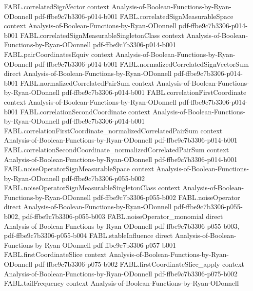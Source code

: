\begin{theorem}
\proofstep
  {FABL.correlatedSignVector}
  {context}
  {Analysis-of-Boolean-Functions-by-Ryan-ODonnell}
  {pdf-ffbe9c7b3306-p014-b001}
\proofstep
  {FABL.correlatedSignMeasurableSpace}
  {context}
  {Analysis-of-Boolean-Functions-by-Ryan-ODonnell}
  {pdf-ffbe9c7b3306-p014-b001}
\proofstep
  {FABL.correlatedSignMeasurableSingletonClass}
  {context}
  {Analysis-of-Boolean-Functions-by-Ryan-ODonnell}
  {pdf-ffbe9c7b3306-p014-b001}
\proofstep
  {FABL.pairCoordinatesEquiv}
  {context}
  {Analysis-of-Boolean-Functions-by-Ryan-ODonnell}
  {pdf-ffbe9c7b3306-p014-b001}
\proofstep
  {FABL.normalizedCorrelatedSignVectorSum}
  {direct}
  {Analysis-of-Boolean-Functions-by-Ryan-ODonnell}
  {pdf-ffbe9c7b3306-p014-b001}
\proofstep
  {FABL.normalizedCorrelatedPairSum}
  {context}
  {Analysis-of-Boolean-Functions-by-Ryan-ODonnell}
  {pdf-ffbe9c7b3306-p014-b001}
\proofstep
  {FABL.correlationFirstCoordinate}
  {context}
  {Analysis-of-Boolean-Functions-by-Ryan-ODonnell}
  {pdf-ffbe9c7b3306-p014-b001}
\proofstep
  {FABL.correlationSecondCoordinate}
  {context}
  {Analysis-of-Boolean-Functions-by-Ryan-ODonnell}
  {pdf-ffbe9c7b3306-p014-b001}
\proofstep
  {FABL.correlationFirstCoordinate_normalizedCorrelatedPairSum}
  {context}
  {Analysis-of-Boolean-Functions-by-Ryan-ODonnell}
  {pdf-ffbe9c7b3306-p014-b001}
\proofstep
  {FABL.correlationSecondCoordinate_normalizedCorrelatedPairSum}
  {context}
  {Analysis-of-Boolean-Functions-by-Ryan-ODonnell}
  {pdf-ffbe9c7b3306-p014-b001}
\proofstep
  {FABL.noiseOperatorSignMeasurableSpace}
  {context}
  {Analysis-of-Boolean-Functions-by-Ryan-ODonnell}
  {pdf-ffbe9c7b3306-p055-b002}
\proofstep
  {FABL.noiseOperatorSignMeasurableSingletonClass}
  {context}
  {Analysis-of-Boolean-Functions-by-Ryan-ODonnell}
  {pdf-ffbe9c7b3306-p055-b002}
\proofstep
  {FABL.noiseOperator}
  {direct}
  {Analysis-of-Boolean-Functions-by-Ryan-ODonnell}
  {pdf-ffbe9c7b3306-p055-b002,
    pdf-ffbe9c7b3306-p055-b003}
\proofstep
  {FABL.noiseOperator_monomial}
  {direct}
  {Analysis-of-Boolean-Functions-by-Ryan-ODonnell}
  {pdf-ffbe9c7b3306-p055-b003,
    pdf-ffbe9c7b3306-p055-b004}
\proofstep
  {FABL.stableInfluence}
  {direct}
  {Analysis-of-Boolean-Functions-by-Ryan-ODonnell}
  {pdf-ffbe9c7b3306-p057-b001}
\proofstep
  {FABL.firstCoordinateSlice}
  {context}
  {Analysis-of-Boolean-Functions-by-Ryan-ODonnell}
  {pdf-ffbe9c7b3306-p075-b002}
\proofstep
  {FABL.firstCoordinateSlice_apply}
  {context}
  {Analysis-of-Boolean-Functions-by-Ryan-ODonnell}
  {pdf-ffbe9c7b3306-p075-b002}
\proofstep
  {FABL.tailFrequency}
  {context}
  {Analysis-of-Boolean-Functions-by-Ryan-ODonnell}

\end{theorem}
